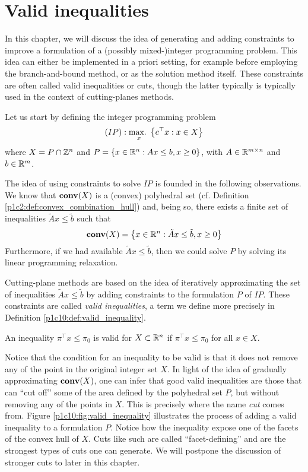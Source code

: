 \section{Valid inequalities}

In this chapter, we will discuss the idea of generating and adding constraints to improve a formulation of a (possibly mixed-)integer programming problem. This idea can either be implemented in a priori setting, for example before employing the branch-and-bound method, or as the solution method itself. These constraints are often called valid inequalities or cuts, though the latter typically is typically used in the context of cutting-planes methods.

Let us start by defining the integer programming problem
%
\begin{equation*}
	(IP) : \mathop{\text{max.~}}_x \left\{ c^\top x : x \in X \right \}
\end{equation*}
%
where $X = P \cap \mathbb{Z}^n$ and $P = \left\{ x \in \mathbb{R}^n : Ax \leq b, x \geq 0 \right \}$, with $A \in \mathbb{R}^{m \times n}$ and $b \in \mathbb{R}^m$. 

The idea of using constraints to solve $IP$ is founded in the following observations. We know that $\mathop{\bf conv}(X)$ is a (convex) polyhedral set (cf. Definition \ref{p1c2:def:convex_combination_hull}) and, being so, there exists a finite set of inequalities $\tilde{A}x \le \tilde{b}$ such that 
%
\begin{equation*}
	\mathop{\bf conv}(X) = \left\{ x \in \mathbb{R}^n: \tilde{A}x \leq \tilde{b}, x \geq 0 \right \}	
\end{equation*}
%
Furthermore, if we had available $\tilde{A}x \le \tilde{b}$, then we could solve $P$ by solving its linear programming relaxation.

Cutting-plane methods are based on the idea of iteratively approximating the set of inequalities $\tilde{A}x \le \tilde{b}$ by adding constraints to the formulation $P$ of $IP$. These constraints are called \emph{valid inequalities}, a term we define more precisely in Definition \ref{p1c10:def:valid_inequality}.

\begin{definition} \label{p1c10:def:valid_inequality}
	An inequality $\pi^\top  x \leq \pi_0$ is valid for $X \subset \mathbb{R}^n$ if $\pi^\top  x \leq \pi_0$ for all $x \in X$.
\end{definition}

Notice that the condition for an inequality to be valid is that it does not remove any of the point in the original integer set $X$. In light of the idea of gradually approximating $\mathop{\bf conv}(X)$, one can infer that good valid inequalities are those that can ``cut off'' some of the area defined by the polyhedral set $P$, but without removing any of the points in $X$. This is precisely where the name \emph{cut} comes from. Figure \ref{p1c10:fig:valid_inequality} illustrates the process of adding a valid inequality to a formulation $P$. Notice how the inequality expose one of the facets of the convex hull of $X$. Cuts like such are called ``facet-defining'' and are the strongest types of cuts one can generate. We will postpone the discussion of stronger cuts to later in this chapter.


